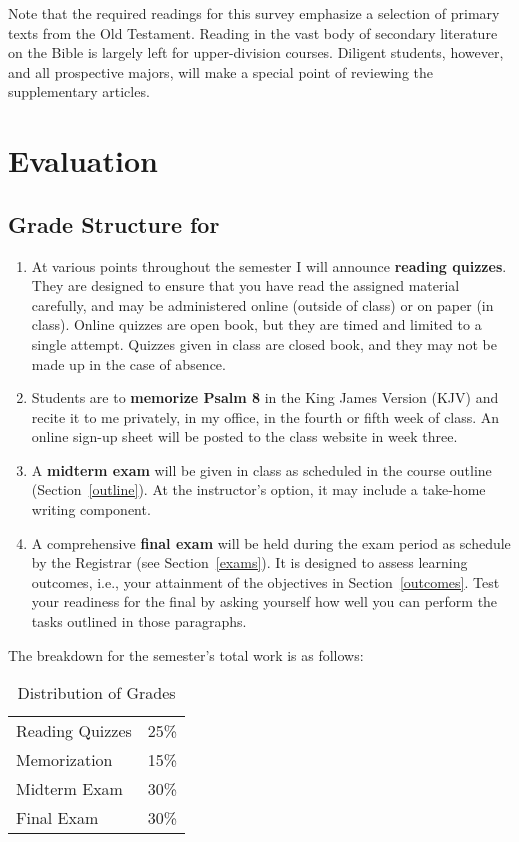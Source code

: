 \documentclass[titlepage]{article}
\begin{document}
Note that the required readings for this survey emphasize a selection of
primary texts from the Old Testament. Reading in the vast body of
secondary literature on the Bible is largely left for upper-division
courses. Diligent students, however, and all prospective majors, will
make a special point of reviewing the supplementary articles.

\section{Evaluation}
\label{evaluation}

\subsection{Grade Structure for \ccode}
\label{structure}

\begin{enumerate}
 \item At various points throughout the semester I will announce
   \textbf{reading quizzes}. They are designed to ensure that you have
   read the assigned material carefully, and may be administered online
   (outside of class) or on paper (in class). Online quizzes are open
   book, but they are timed and limited to a single attempt. Quizzes
   given in class are closed book, and they may not be made up in the
   case of absence.
 \item Students are to \textbf{memorize Psalm 8} in the King James
   Version (KJV) and recite it to me privately, in my office, in the
   fourth or fifth week of class. An online sign-up sheet will be posted
   to the class website in week three.
 \item A \textbf{midterm exam} will be given in class as scheduled in
   the course outline (Section~\ref{outline}). At the instructor's
   option, it may include a take-home writing component.
 \item A comprehensive \textbf{final exam} will be held during the exam
   period as schedule by the Registrar (see Section~\ref{exams}). It is
   designed to assess learning outcomes, i.e., your attainment of the
   objectives in Section~\ref{outcomes}. Test your readiness for the
   final by asking yourself how well you can perform the tasks outlined
   in those paragraphs.
\end{enumerate}

The breakdown for the semester's total work is as follows:

\begin{table}[htbp]
  \centering
  {\lining
  \begin{tabular}{lr}
    \toprule
    Reading Quizzes & 25\% \\
    Memorization    & 15\% \\
    Midterm Exam    & 30\% \\
    Final Exam      & 30\% \\
    \bottomrule
  \end{tabular}}
  \caption{Distribution of Grades}
  \label{distribution}
\end{table}
\end{document}

